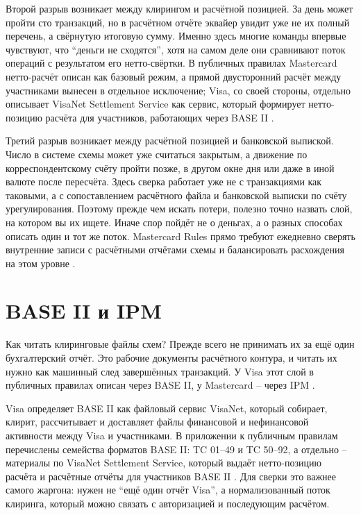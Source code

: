 Второй разрыв возникает между клирингом и расчётной позицией. За день
может пройти сто транзакций, но в расчётном отчёте эквайер увидит уже
не их полный перечень, а свёрнутую итоговую сумму. Именно здесь многие
команды впервые чувствуют, что \enquote{деньги не сходятся}, хотя на
самом деле они сравнивают поток операций с результатом его
нетто-свёртки. В публичных правилах Mastercard нетто-расчёт описан как
базовый режим, а прямой двусторонний расчёт между участниками вынесен в отдельное
исключение; Visa, со своей стороны, отдельно описывает VisaNet
Settlement Service как сервис, который формирует нетто-позицию расчёта
для участников, работающих через BASE II \cite{mc-rules}\cite{visa-core-rules}.

Третий разрыв возникает между расчётной позицией и банковской выпиской.
Число в системе схемы может уже считаться закрытым, а движение по
корреспондентскому счёту пройти позже, в другом окне дня или даже в
иной валюте после пересчёта. Здесь сверка работает уже не с
транзакциями как таковыми, а с сопоставлением расчётного файла и
банковской выписки по счёту урегулирования. Поэтому прежде чем искать
потери, полезно точно назвать слой, на котором вы их ищете. Иначе спор
пойдёт не о деньгах, а о разных способах описать один и тот же поток.
Mastercard Rules прямо требуют ежедневно сверять внутренние записи с
расчётными отчётами схемы и балансировать расхождения на этом уровне
\cite{mc-rules}.

\section{BASE II и IPM}
\label{sec:recon-tc33-ipm}

Как читать клиринговые файлы схем? Прежде всего не принимать их за
ещё один бухгалтерский отчёт. Это рабочие документы расчётного контура,
и читать их нужно как машинный след завершённых транзакций. У Visa этот
слой в публичных правилах описан через BASE II, у Mastercard -- через
IPM \cite{visa-core-rules}\cite{mc-pfmi-disclosure}.

Visa определяет BASE II как файловый сервис VisaNet, который собирает,
клирит, рассчитывает и доставляет файлы финансовой и нефинансовой
активности между Visa и участниками. В приложении к публичным правилам
перечислены семейства форматов BASE II: TC 01--49
и TC 50--92, а отдельно -- материалы по VisaNet Settlement Service,
который выдаёт нетто-позицию расчёта и расчётные отчёты для участников
BASE II \cite{visa-core-rules}. Для сверки это важнее
самого жаргона: нужен не \enquote{ещё один отчёт Visa}, а
нормализованный поток клиринга, который можно связать с авторизацией и
последующим расчётом.

